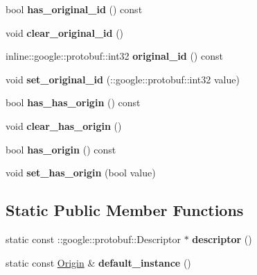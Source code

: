 \begin{DoxyCompactItemize}
\item 
\hypertarget{classlattice_1_1Origin_a27d775c4dbd86e55dd6b2bac5f53a194}{
bool {\bfseries has\_\-original\_\-id} () const }
\label{classlattice_1_1Origin_a27d775c4dbd86e55dd6b2bac5f53a194}

\item 
\hypertarget{classlattice_1_1Origin_ae14e0ae4e2b32f4948842a8c64925416}{
void {\bfseries clear\_\-original\_\-id} ()}
\label{classlattice_1_1Origin_ae14e0ae4e2b32f4948842a8c64925416}

\item 
\hypertarget{classlattice_1_1Origin_a0a00308cd28bd4e3836c6a0418276aa5}{
inline::google::protobuf::int32 {\bfseries original\_\-id} () const }
\label{classlattice_1_1Origin_a0a00308cd28bd4e3836c6a0418276aa5}

\item 
\hypertarget{classlattice_1_1Origin_a97ff5372885f733870170f9dfbd3032b}{
void {\bfseries set\_\-original\_\-id} (::google::protobuf::int32 value)}
\label{classlattice_1_1Origin_a97ff5372885f733870170f9dfbd3032b}

\item 
\hypertarget{classlattice_1_1Origin_ad04e2fe74f9c22a83fc22548ade3fd7c}{
bool {\bfseries has\_\-has\_\-origin} () const }
\label{classlattice_1_1Origin_ad04e2fe74f9c22a83fc22548ade3fd7c}

\item 
\hypertarget{classlattice_1_1Origin_ae06e598e03504e3f52a69e1649ef0b84}{
void {\bfseries clear\_\-has\_\-origin} ()}
\label{classlattice_1_1Origin_ae06e598e03504e3f52a69e1649ef0b84}

\item 
\hypertarget{classlattice_1_1Origin_a7b9159f866b74e939a6805a1d765a663}{
bool {\bfseries has\_\-origin} () const }
\label{classlattice_1_1Origin_a7b9159f866b74e939a6805a1d765a663}

\item 
\hypertarget{classlattice_1_1Origin_a7162284423c272a182e8ec697321b97a}{
void {\bfseries set\_\-has\_\-origin} (bool value)}
\label{classlattice_1_1Origin_a7162284423c272a182e8ec697321b97a}

\end{DoxyCompactItemize}
\subsection*{Static Public Member Functions}
\begin{DoxyCompactItemize}
\item 
\hypertarget{classlattice_1_1Origin_a3b2619013446279bfce0f7f2d85f6365}{
static const ::google::protobuf::Descriptor $\ast$ {\bfseries descriptor} ()}
\label{classlattice_1_1Origin_a3b2619013446279bfce0f7f2d85f6365}

\item 
\hypertarget{classlattice_1_1Origin_ae801e2e2d4d7bc077f11e208da2baeaa}{
static const \hyperlink{classlattice_1_1Origin}{Origin} \& {\bfseries default\_\-instance} ()}
\label{classlattice_1_1Origin_ae801e2e2d4d7bc077f11e208da2baeaa}

\end{DoxyCompactItemize}
